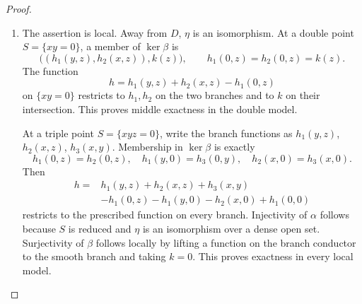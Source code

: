 \begin{proof}
\begin{enumerate}[label={$\langle1\rangle$\arabic*.},leftmargin=*]
\item 
The assertion is local.  Away from $D$, $\eta$ is an isomorphism.
At a double point $S=\{xy=0\}$, a member of $\ker\beta$ is
\[
\bigl((h_1(y,z),h_2(x,z)),k(z)\bigr),
\qquad
h_1(0,z)=h_2(0,z)=k(z).
\]
The function
\[
h=h_1(y,z)+h_2(x,z)-h_1(0,z)
\]
on $\{xy=0\}$ restricts to $h_1,h_2$ on the two branches and to $k$ on
their intersection.  This proves middle exactness in the double model.

At a triple point $S=\{xyz=0\}$, write the branch functions as
$h_1(y,z)$, $h_2(x,z)$, $h_3(x,y)$.  Membership in $\ker\beta$ is exactly
\[
h_1(0,z)=h_2(0,z),\quad
h_1(y,0)=h_3(0,y),\quad
h_2(x,0)=h_3(x,0).
\]
Then
\[
\begin{split}
h={}&h_1(y,z)+h_2(x,z)+h_3(x,y)\\
&-h_1(0,z)-h_1(y,0)-h_2(x,0)+h_1(0,0)
\end{split}
\]
restricts to the prescribed function on every branch.  Injectivity of
$\alpha$ follows because $S$ is reduced and $\eta$ is an isomorphism over a
dense open set.  Surjectivity of $\beta$ follows locally by lifting a
function on the branch conductor to the smooth branch and taking $k=0$.
This proves exactness in every local model.

\end{enumerate}
\end{proof}
